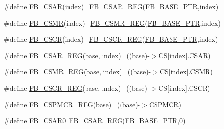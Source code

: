 \begin{DoxyCompactItemize}
\item 
\#define \hyperlink{group___f_b___register___accessor___macros_gad14bade8cd71144a1ab53db91b835881}{F\+B\+\_\+\+C\+S\+AR}(index)                                                  ~\hyperlink{group___f_b___register___accessor___macros_gab4eabed8c463260d1811c99bf92b8aaa}{F\+B\+\_\+\+C\+S\+A\+R\+\_\+\+R\+EG}(\hyperlink{group___f_b___peripheral_gace69013248279ed94480b3d6f6aa9fa6}{F\+B\+\_\+\+B\+A\+S\+E\+\_\+\+P\+TR},index)
\item 
\#define \hyperlink{group___f_b___register___accessor___macros_gac0956d3859461d739b757ff31f57ae5c}{F\+B\+\_\+\+C\+S\+MR}(index)                                                  ~\hyperlink{group___f_b___register___accessor___macros_gab85f399c0321b8598ed28acbb356e966}{F\+B\+\_\+\+C\+S\+M\+R\+\_\+\+R\+EG}(\hyperlink{group___f_b___peripheral_gace69013248279ed94480b3d6f6aa9fa6}{F\+B\+\_\+\+B\+A\+S\+E\+\_\+\+P\+TR},index)
\item 
\#define \hyperlink{group___f_b___register___accessor___macros_ga60f6318bba071640865153af2fe7fb33}{F\+B\+\_\+\+C\+S\+CR}(index)                                                  ~\hyperlink{group___f_b___register___accessor___macros_ga103c332d2bf6b4de271753e3599d60de}{F\+B\+\_\+\+C\+S\+C\+R\+\_\+\+R\+EG}(\hyperlink{group___f_b___peripheral_gace69013248279ed94480b3d6f6aa9fa6}{F\+B\+\_\+\+B\+A\+S\+E\+\_\+\+P\+TR},index)
\item 
\#define \hyperlink{group___f_b___register___accessor___macros_gab4eabed8c463260d1811c99bf92b8aaa}{F\+B\+\_\+\+C\+S\+A\+R\+\_\+\+R\+EG}(base,  index)                                ~((base)-\/$>$CS\mbox{[}index\mbox{]}.C\+S\+AR)
\item 
\#define \hyperlink{group___f_b___register___accessor___macros_gab85f399c0321b8598ed28acbb356e966}{F\+B\+\_\+\+C\+S\+M\+R\+\_\+\+R\+EG}(base,  index)                                ~((base)-\/$>$CS\mbox{[}index\mbox{]}.C\+S\+MR)
\item 
\#define \hyperlink{group___f_b___register___accessor___macros_ga103c332d2bf6b4de271753e3599d60de}{F\+B\+\_\+\+C\+S\+C\+R\+\_\+\+R\+EG}(base,  index)                                ~((base)-\/$>$CS\mbox{[}index\mbox{]}.C\+S\+CR)
\item 
\#define \hyperlink{group___f_b___register___accessor___macros_ga6fe638cb9de1da832ed97ec78038e98f}{F\+B\+\_\+\+C\+S\+P\+M\+C\+R\+\_\+\+R\+EG}(base)                                        ~((base)-\/$>$C\+S\+P\+M\+CR)
\item 
\#define \hyperlink{group___f_b___register___accessor___macros_ga444494eb7e637dcea435c4dc66ed7cd4}{F\+B\+\_\+\+C\+S\+A\+R0}~\hyperlink{group___f_b___register___accessor___macros_gab4eabed8c463260d1811c99bf92b8aaa}{F\+B\+\_\+\+C\+S\+A\+R\+\_\+\+R\+EG}(\hyperlink{group___f_b___peripheral_gace69013248279ed94480b3d6f6aa9fa6}{F\+B\+\_\+\+B\+A\+S\+E\+\_\+\+P\+TR},0)

\end{DoxyCompactItemize}
